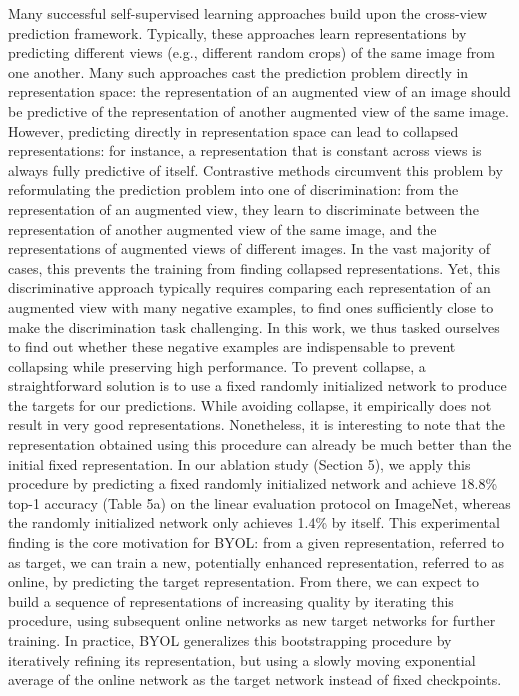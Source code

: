 \documentclass[
]{krantz}
\begin{document}
Many successful self-supervised learning approaches build upon the cross-view prediction framework. Typically, these approaches learn representations by predicting different views (e.g., different random crops) of the same image from one another. Many such approaches cast the prediction problem directly in representation space: the representation of an augmented view of an image should be predictive of the representation of another augmented view of the same image. However, predicting directly in representation space can lead to collapsed representations: for instance, a representation that is constant across views is always fully predictive of itself. Contrastive methods circumvent this problem by reformulating the prediction problem into one of discrimination: from the representation of an augmented view, they learn to discriminate between the representation of another augmented view of the same image, and the representations of augmented views of different images. In the vast majority of cases, this prevents the training from finding collapsed representations. Yet, this discriminative approach typically requires comparing each representation of an augmented view with many negative examples, to find ones sufficiently close to make the discrimination task challenging. In this work, we thus tasked ourselves to find out whether these negative examples are indispensable to prevent collapsing while preserving high performance.
To prevent collapse, a straightforward solution is to use a fixed randomly initialized network to produce the targets for our predictions. While avoiding collapse, it empirically does not result in very good representations. Nonetheless, it is interesting to note that the representation obtained using this procedure can already be much better than the initial fixed representation. In our ablation study (Section 5), we apply this procedure by predicting a fixed randomly initialized network and achieve 18.8\% top-1 accuracy (Table 5a) on the linear evaluation protocol on ImageNet, whereas the randomly initialized network only achieves 1.4\% by itself. This experimental finding is the core motivation for BYOL: from a given representation, referred to as target, we can train a new, potentially enhanced representation, referred to as online, by predicting the target representation. From there, we can expect to build a sequence of representations of increasing quality by iterating this procedure, using subsequent online networks as new target networks for further training. In practice, BYOL generalizes this bootstrapping procedure by iteratively refining its representation, but using a slowly moving exponential average of the online network as the target network instead of fixed checkpoints.
\end{document}
